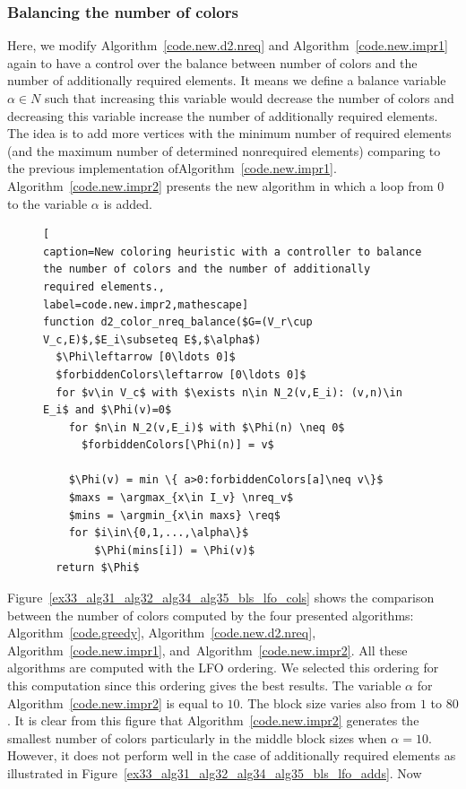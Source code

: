 \documentclass[12pt, twoside,a4paper,toc=bibliography]{scrbook}
\DeclareMathOperator*{\argmin}{arg\,min}
\DeclareMathOperator*{\argmax}{arg\,max}
\newcommand{\figref}[1]{Figure~\protect\ref{#1}}
\newcommand{\coderef}[1]{Algorithm~\protect\ref{#1}}
\newcommand{\nreq}{L}
\newcommand{\req}{M}
\begin{document}
\subsubsection{Balancing the number of colors}
Here, we modify \coderef{code.new.d2.nreq} and \coderef{code.new.impr1} again 
to have a control over the balance between number of 
colors and the number of additionally required elements.
It means we define a balance variable $\alpha \in N$ such that increasing this variable would decrease
the number of colors and decreasing this variable increase the number of additionally required elements.
The idea is to add more vertices with the minimum number of required elements
(and the maximum number of determined nonrequired elements)
comparing to the previous implementation of\coderef{code.new.impr1}.
\coderef{code.new.impr2} presents the new algorithm in which 
a loop from $0$ to the variable $\alpha$ is added.
\begin{figure}
\begin{lstlisting}[
caption=New coloring heuristic with a controller to balance
the number of colors and the number of additionally required elements.,
label=code.new.impr2,mathescape]
function d2_color_nreq_balance($G=(V_r\cup V_c,E)$,$E_i\subseteq E$,$\alpha$)
  $\Phi\leftarrow [0\ldots 0]$
  $forbiddenColors\leftarrow [0\ldots 0]$
  for $v\in V_c$ with $\exists n\in N_2(v,E_i): (v,n)\in E_i$ and $\Phi(v)=0$
    for $n\in N_2(v,E_i)$ with $\Phi(n) \neq 0$
      $forbiddenColors[\Phi(n)] = v$

    $\Phi(v) = min \{ a>0:forbiddenColors[a]\neq v\}$
    $maxs = \argmax_{x\in I_v} \nreq_v$
    $mins = \argmin_{x\in maxs} \req$
    for $i\in\{0,1,...,\alpha\}$
        $\Phi(mins[i]) = \Phi(v)$
  return $\Phi$
\end{lstlisting}
\end{figure}

\figref{ex33_alg31_alg32_alg34_alg35_bls_lfo_cols}
shows the comparison between the number of colors computed by 
the four presented algorithms: \coderef{code.greedy},  \coderef{code.new.d2.nreq},
\coderef{code.new.impr1}, and~\coderef{code.new.impr2}.
All these algorithms are computed with the LFO ordering.
We selected this ordering for this computation 
since this ordering gives the best results.
The variable $\alpha$ for \coderef{code.new.impr2} is equal to $10$.
The block size varies also from $1$ to $80$.
It is clear from this figure that \coderef{code.new.impr2} generates the 
smallest number of colors particularly in the middle block sizes when $\alpha=10$.
However, it does not perform well in the case of additionally
required elements as illustrated in \figref{ex33_alg31_alg32_alg34_alg35_bls_lfo_adds}.
Now
\end{document}
